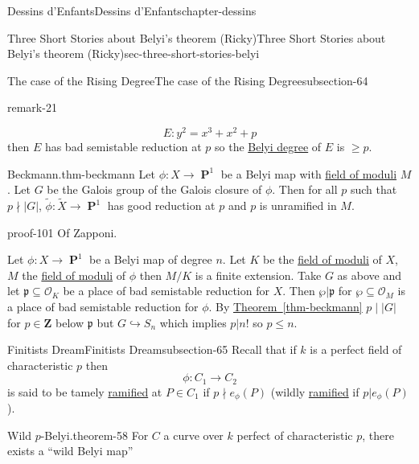 \documentclass[oneside,10pt,]{book}
\numberwithin{equation}{section}
\newcommand{\ideal}[1]{\mathfrak{#1}}
\newcommand{\ZZ}{\mathbf{Z}}
\newcommand{\ints}{\mathcal{O}}
\DeclareMathOperator{\PP}{\mathbf{P}}
\begin{document}
\begin{chapterptx}{Dessins d'Enfants}{}{Dessins d'Enfants}{}{}{chapter-dessins}
\begin{sectionptx}{Three Short Stories about Belyi's theorem (Ricky)}{}{Three Short Stories about Belyi's theorem (Ricky)}{}{}{sec-three-short-stories-belyi}
\begin{subsectionptx}{The case of the Rising Degree}{}{The case of the Rising Degree}{}{}{subsection-64}
\begin{remark}{}{remark-21}
\begin{enumerate}
\begin{equation*}
E\colon y^2 = x^3 + x^2 + p
\end{equation*}
then \(E\) has bad semistable reduction at \(p\) so the \hyperref[def-belyi-degree]{Belyi degree} of \(E\) is \(\ge p\).%
\end{enumerate}
%
\end{remark}
\begin{theorem}{Beckmann.}{}{thm-beckmann}%
\hypertarget{p-745}{}%
Let \(\phi \colon X \to \PP^1\) be a Belyi map with \hyperref[def-field-of-moduli]{field of moduli} \(M\). Let \(G\) be the Galois group of the Galois closure of \(\phi\). Then for all \(p\) such that \(p \nmid |G|\), \(\tilde \phi \colon \tilde X \to \PP^1\) has good reduction at \(p\) and \(p\) is unramified in \(M\).%
\end{theorem}
\begin{proofptx}{}{proof-101}
\hypertarget{p-746}{}%
Of Zapponi.%
\par
\hypertarget{p-747}{}%
Let \(\phi\colon X \to \PP^1\) be a Belyi map of degree \(n\). Let \(K\) be the \hyperref[def-field-of-moduli]{field of moduli} of \(X\), \(M\) the \hyperref[def-field-of-moduli]{field of moduli} of \(\phi\) then \(M/K\) is a finite extension. Take \(G\) as above and let \(\ideal p \subseteq \ints_K\) be a place of bad semistable reduction for \(X\). Then \(\wp| \ideal p\) for \(\wp \subseteq \ints_M\) is a place of bad semistable reduction for \(\phi\). By \hyperref[thm-beckmann]{Theorem~\ref{thm-beckmann}} \(p \mid |G|\) for \(p\in \ZZ\) below \(\ideal p\) but \(G \hookrightarrow S_n\) which implies \(p|n!\) so \(p\le n\).%
\end{proofptx}
\end{subsectionptx}
%
%
\typeout{************************************************}
\typeout{************************************************}
%
\begin{subsectionptx}{Finitists Dream}{}{Finitists Dream}{}{}{subsection-65}
\hypertarget{p-748}{}%
Recall that if \(k \) is a perfect field of characteristic \(p\) then%
\begin{equation*}
\phi \colon C_1 \to C_2
\end{equation*}
is said to be tamely \hyperref[def-dess-ramified]{ramified} at \(P\in C_1\) if \(p\nmid e_\phi(P)\) (wildly \hyperref[def-dess-ramified]{ramified} if \(p |e_\phi(P)\)).%
\begin{theorem}{Wild \(p\)-Belyi.}{}{theorem-58}%
\hypertarget{p-749}{}%
For \(C\) a curve over \(k\) perfect of characteristic \(p\), there exists a ``wild Belyi map''%

\end{theorem}
\end{subsectionptx}
\end{sectionptx}
\end{chapterptx}
\end{document}
